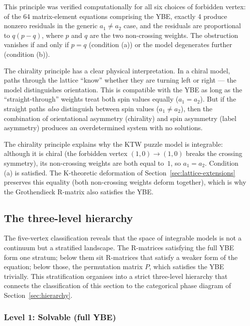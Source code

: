 This principle was verified computationally for all six choices of
forbidden vertex: of the 64 matrix-element equations comprising the
YBE, exactly 4 produce nonzero residuals in the generic $a_1 \neq a_2$
case, and the residuals are proportional to $q(p - q)$, where $p$ and
$q$ are the two non-crossing weights.  The obstruction vanishes if and
only if $p = q$ (condition (a)) or the model degenerates further
(condition (b)).

The chirality principle has a clear physical interpretation.  In a
chiral model, paths through the lattice ``know'' whether they are
turning left or right --- the model distinguishes orientation.  This
is compatible with the YBE as long as the ``straight-through'' weights
treat both spin values equally ($a_1 = a_2$).  But if the straight
paths \emph{also} distinguish between spin values ($a_1 \neq a_2$),
then the combination of orientational asymmetry (chirality) and spin
asymmetry (label asymmetry) produces an overdetermined system with no
solutions.

\begin{remark}
The chirality principle explains why the KTW puzzle model is
integrable: although it is chiral (the forbidden vertex
$(1,0) \to (1,0)$ breaks the crossing symmetry), its non-crossing
weights are both equal to~$1$, so $a_1 = a_2$.  Condition (a) is
satisfied.  The K-theoretic deformation of
Section~\ref{sec:lattice-extensions} preserves this equality (both
non-crossing weights deform together), which is why the Grothendieck
R-matrix also satisfies the YBE.
\end{remark}


\subsection{The three-level hierarchy}
\label{sec:groupoid-hierarchy}

The five-vertex classification reveals that the space of integrable
models is not a continuum but a stratified landscape.  The R-matrices
satisfying the full YBE form one stratum; below them sit R-matrices
that satisfy a weaker form of the equation; below those, the
permutation matrix $P$, which satisfies the YBE trivially.  This
stratification organises into a strict three-level hierarchy that
connects the classification of this section to the categorical phase
diagram of Section~\ref{sec:hierarchy}.

\subsubsection*{Level 1: Solvable (full YBE)}

